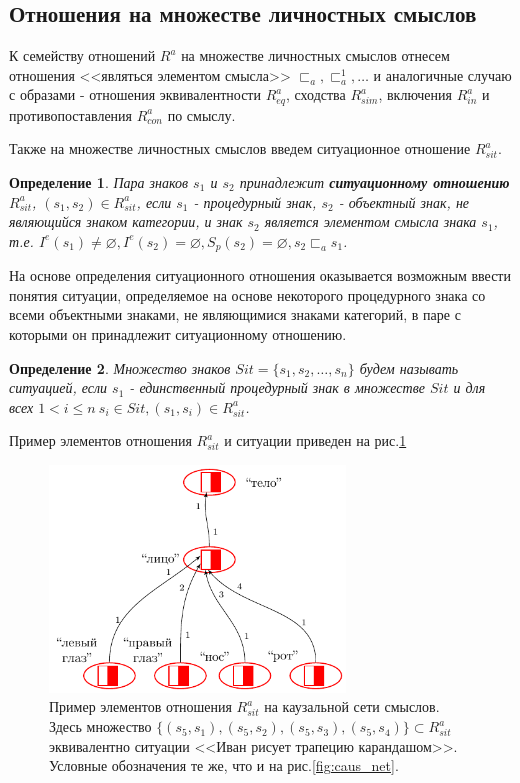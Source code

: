 \documentclass[12pt]{scrartcl}
\newtheorem{definition}{Определение}
\begin{document}
	\subsection{Отношения на множестве личностных смыслов}	
	К семейству отношений $R^a$ на множестве личностных смыслов отнесем отношения <<являться элементом смысла>> ${\sqsubset_a,\sqsubset_a^1,\dots}$ и аналогичные случаю с образами - отношения эквивалентности $R_{eq}^a$, сходства $R_{sim}^a$, включения $R_{in}^a$ и противопоставления $R_{con}^a$ по смыслу.
	
	Также на множестве личностных смыслов введем ситуационное отношение $R_{sit}^a$.

	\begin{definition}
		Пара знаков $s_1$ и $s_2$ принадлежит \textbf{ситуационному отношению} $R_{sit}^a$, $(s_1,s_2)\in R_{sit}^a$, если $s_1$ - процедурный знак, $s_2$ - объектный знак, не являющийся знаком категории, и знак $s_2$ является элементом смысла знака $s_1$, т.е. $I^e(s_1)\not = \varnothing, I^e(s_2) = \varnothing, S_p(s_2)=\varnothing, s_2\sqsubset_a s_1$.
	\end{definition}
	
	На основе определения ситуационного отношения оказывается возможным ввести понятия ситуации, определяемое на основе некоторого процедурного знака со всеми объектными знаками, не являющимися знаками категорий, в паре с которыми он принадлежит ситуационному отношению.
	
	\begin{definition}
		Множество знаков $Sit=\{s_1,s_2,\dots,s_n\}$ будем называть \textit{ситуацией}, если $s_1$ - единственный процедурный знак в множестве $Sit$ и для всех $1<i\leq n\ s_i\in Sit, (s_1,s_i)\in R_{sit}^a$.
	\end{definition}
	
	Пример элементов отношения $R_{sit}^a$ и ситуации приведен на рис.\ref{fig:mean_relat}

	\begin{figure}[h]
		\centering
		\includegraphics[width=0.7\textwidth,page=3]{examples/causnet/caus_net_colored}
		\caption{Пример элементов отношения $R_{sit}^a$ на каузальной сети смыслов. Здесь множество $\{(s_5,s_1),(s_5,s_2),(s_5,s_3),(s_5,s_4)\}\subset R_{sit}^a$ эквивалентно ситуации <<Иван рисует трапецию карандашом>>. Условные обозначения те же, что и на рис.\ref{fig:caus_net}.}
		\label{fig:mean_relat}		
	\end{figure}
			
\end{document}
